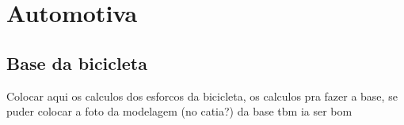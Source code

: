 \chapter[Automotiva]{Automotiva}
\label{cha:automotiva_desenvolvimento}


\section{Base da bicicleta}
Colocar aqui os calculos dos esforcos da bicicleta, os calculos pra fazer a base, se puder colocar a foto da modelagem (no catia?) da base tbm ia ser bom